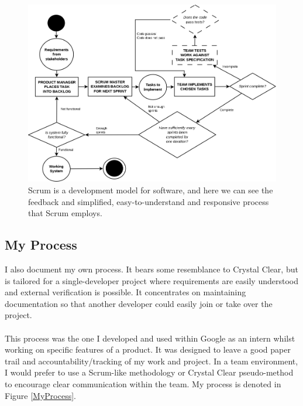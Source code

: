 \begin{figure}[ht!]
	\centering
	\includegraphics[scale=0.3]{media/Scrum}
	\caption{Scrum is a development model for software, and here we can see the feedback and
		simplified, easy-to-understand and responsive process that Scrum employs.}
	\label{ScrumFig}
\end{figure}

\subsection{My Process}
I also document my own process.
It bears some resemblance to Crystal Clear, but is tailored for a single-developer project where
requirements are easily understood and external verification is possible.
It concentrates on maintaining documentation so that another developer could easily join or take
over the project.\\
\\
This process was the one I developed and used within Google as an intern whilst
working on specific features of a product.
It was designed to leave a good paper trail and accountability/tracking of my
work and project.
In a team environment, I would prefer to use a Scrum-like methodology or Crystal Clear pseudo-method
to encourage clear communication within the team.
My process is denoted in Figure \ref{MyProcess}.

